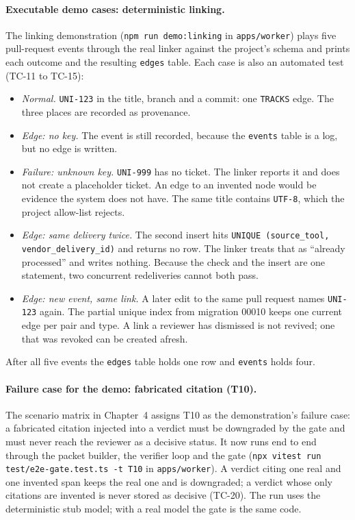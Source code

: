 \paragraph{Executable demo cases: deterministic linking.}
The linking demonstration (\texttt{npm run demo:\allowbreak{}linking} in
\texttt{apps/\allowbreak{}worker}) plays five pull-request events through the real
linker against the project's schema and prints each outcome and the resulting
\texttt{edges} table. Each case is also an automated test (TC-11 to TC-15):
\begin{itemize}
  \item \emph{Normal.} \texttt{UNI-123} in the title, branch and a commit: one
        \texttt{TRACKS} edge. The three places are recorded as provenance.
  \item \emph{Edge: no key.} The event is still recorded, because the
        \texttt{events} table is a log, but no edge is written.
  \item \emph{Failure: unknown key.} \texttt{UNI-999} has no ticket. The
        linker reports it and does not create a placeholder ticket. An edge to
        an invented node would be evidence the system does not have. The same
        title contains \texttt{UTF-8}, which the project allow-list rejects.
  \item \emph{Edge: same delivery twice.} The second insert hits
        \texttt{UNIQUE (source\_tool,} \texttt{vendor\_\allowbreak{}delivery\_\allowbreak{}id)} and returns no row.
        The linker treats that as ``already processed'' and writes nothing.
        Because the check and the insert are one statement, two concurrent
        redeliveries cannot both pass.
  \item \emph{Edge: new event, same link.} A later edit to the same pull
        request names \texttt{UNI-123} again. The partial unique index from
        migration 00010 keeps one current edge per pair and type. A link a
        reviewer has dismissed is not revived; one that was revoked can be
        created afresh.
\end{itemize}
After all five events the \texttt{edges} table holds one row and
\texttt{events} holds four.

\paragraph{Failure case for the demo: fabricated citation (T10).}
The scenario matrix in Chapter~4 assigns T10 as the demonstration's failure
case: a fabricated citation injected into a verdict must be downgraded by the
gate and must never reach the reviewer as a decisive status. It now runs end to
end through the packet builder, the verifier loop and the gate
(\texttt{npx vitest run test/\allowbreak{}e2e-\allowbreak{}gate.\allowbreak{}test.\allowbreak{}ts -t T10}
in \texttt{apps/\allowbreak{}worker}). A verdict citing one real and one invented
span keeps the real one and is downgraded; a verdict whose only citations are
invented is never stored as decisive (TC-20). The run uses the deterministic
stub model; with a real model the gate is the same code.

